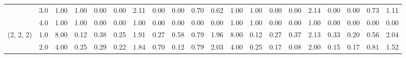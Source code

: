 \begin{tabular}{llrrrrrrrrrrrrrrrrrr}
          & 3.0 &               1.00 &                     1.00 &                                 0.00 &                             0.00 &                           2.11 &                                               0.00 &                                            0.00 &                                            0.70 &                                        0.62 &               1.00 &                     1.00 &                                 0.00 &                             0.00 &                           2.14 &                                               0.00 &                                            0.00 &                                            0.73 &                                        1.11 \\
          & 4.0 &               1.00 &                     1.00 &                                 0.00 &                             0.00 &                           1.00 &                                               0.00 &                                            0.00 &                                            0.00 &                                        0.00 &               1.00 &                     1.00 &                                 0.00 &                             0.00 &                           1.00 &                                               0.00 &                                            0.00 &                                            0.00 &                                        0.00 \\
(2, 2, 2) & 1.0 &               8.00 &                     0.12 &                                 0.38 &                             0.25 &                           1.91 &                                               0.27 &                                            0.58 &                                            0.79 &                                        1.96 &               8.00 &                     0.12 &                                 0.27 &                             0.37 &                           2.13 &                                               0.33 &                                            0.20 &                                            0.56 &                                        2.04 \\
          & 2.0 &               4.00 &                     0.25 &                                 0.29 &                             0.22 &                           1.84 &                                               0.70 &                                            0.12 &                                            0.79 &                                        2.03 &               4.00 &                     0.25 &                                 0.17 &                             0.08 &                           2.00 &                                               0.15 &                                            0.17 &                                            0.81 &                                        1.52 \\

\end{tabular}
